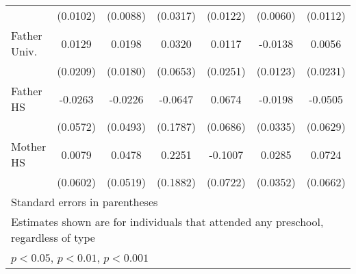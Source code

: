 \begin{table}[htbp]
\begin{tabular}{l*{6}{c}}
            &    (0.0102)         &    (0.0088)         &    (0.0317)         &    (0.0122)         &    (0.0060)         &    (0.0112)         \\
\addlinespace
Father Univ.&      0.0129         &      0.0198         &      0.0320         &      0.0117         &     -0.0138         &      0.0056         \\
            &    (0.0209)         &    (0.0180)         &    (0.0653)         &    (0.0251)         &    (0.0123)         &    (0.0231)         \\
\addlinespace
Father HS   &     -0.0263         &     -0.0226         &     -0.0647         &      0.0674         &     -0.0198         &     -0.0505         \\
            &    (0.0572)         &    (0.0493)         &    (0.1787)         &    (0.0686)         &    (0.0335)         &    (0.0629)         \\
\addlinespace
Mother HS   &      0.0079         &      0.0478         &      0.2251         &     -0.1007         &      0.0285         &      0.0724         \\
            &    (0.0602)         &    (0.0519)         &    (0.1882)         &    (0.0722)         &    (0.0352)         &    (0.0662)         \\
\bottomrule
\multicolumn{7}{l}{\footnotesize Standard errors in parentheses}\\
\multicolumn{7}{l}{\footnotesize Estimates shown are for individuals that attended any preschool, regardless of type}\\
\multicolumn{7}{l}{\footnotesize \sym{*} \(p<0.05\), \sym{**} \(p<0.01\), \sym{***} \(p<0.001\)}\\
\end{tabular}
\end{table}
